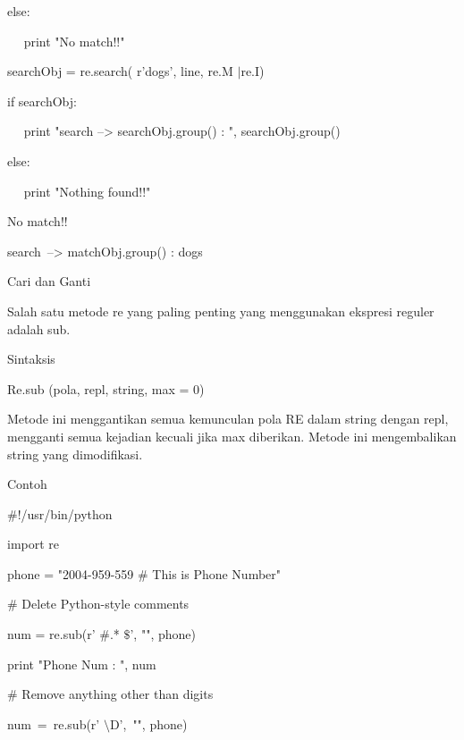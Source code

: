 \begin {enumerate}
\noindent 
else: \par
\noindent 
~~ print "No match!!" \par
\vspace{12pt}
\noindent 
searchObj = re.search( r'dogs', line, re.M $  \vert  $re.I) \par
\noindent 
if searchObj: \par
\noindent 
~~ print "search --> searchObj.group() : ", searchObj.group() \par
\noindent 
else: \par
\noindent 
~~ print "Nothing found!!" \par
\vspace{12pt}
\noindent 
No match!! \par
\noindent 
search~--> matchObj.group() :  dogs \par
\vspace{12pt}
\noindent 
Cari dan Ganti \par
\vspace{12pt}
\noindent 
Salah satu metode re yang paling penting yang menggunakan ekspresi reguler adalah sub. \par
\noindent 
Sintaksis \par
\vspace{12pt}
Re.sub (pola, repl, string, max = 0) \par
\vspace{12pt}
\noindent 
Metode ini menggantikan semua kemunculan pola RE dalam string dengan repl, mengganti semua kejadian kecuali jika max diberikan. Metode ini mengembalikan string yang dimodifikasi. \par
Contoh \par
\noindent 
 $  \#  $!/usr/bin/python \par
\noindent 
import re \par
\vspace{12pt}
\noindent 
phone = "2004-959-559  $  \#  $ This is Phone Number" \par
\vspace{12pt}
\noindent 
 $  \#  $ Delete Python-style comments \par
\noindent 
num = re.sub(r' $  \#  $.* $  \$  $', "", phone) \par
\noindent 
print "Phone Num : ", num \par
\vspace{12pt}
\noindent 
 $  \#  $ Remove anything other than digits \par
\noindent 
num~=~re.sub(r' $  \setminus  $D',~"", phone)     \par

\end{enumerate}
